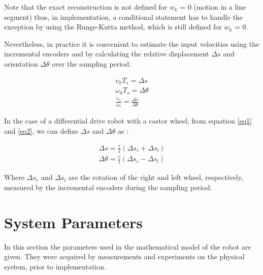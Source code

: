 Note that the exact reconstruction is not defined for $w_k$ = 0 (motion in a line segment) thus, in implementation, a conditional statement has to handle the exception by using the Runge-Kutta method, which is still defined for $w_k$ = 0.

Nevertheless, in practice it is convenient to estimate the input velocities using the incremental encoders	and by calculating the relative displacement $\Delta s$ and orientation $\Delta\theta$  over the sampling period:

\begin{align}
v_k T_s = \Delta s \nonumber \\
\omega_k T_s = \Delta\theta \label{eq17} \\
\frac{v_k}{\omega_k} = \frac{\Delta s}{\Delta\theta} \nonumber
\end{align}

In the case of a differential drive robot with a castor wheel, from equation \ref{eq1} and \ref{eq2}, we can define $\Delta s$ and $\Delta\theta$ as :

\begin{align}
\Delta s 	 = \frac{r}{2}(\Delta s_r + \Delta s_l) \label{eq18} \\
\Delta\theta = \frac{r}{l}(\Delta s_r - \Delta s_l) \nonumber
\end{align}

Where $\Delta s_r$ and  $\Delta s_l$ are the rotation of the right and left wheel, respectively, measured by the incremental encoders during the sampling period. 


\section{System Parameters} \label{parameter}

In this section the parameters used in the mathematical model of the robot are given. They were acquired by measurements and experiments on the physical system, prior to implementation.

